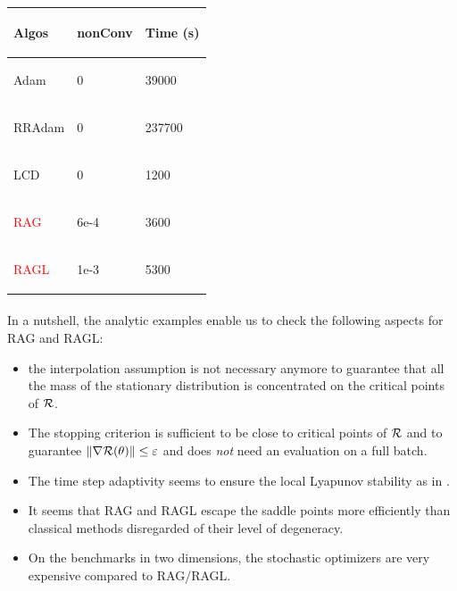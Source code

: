 \begin{table}[h!]
	\begin{tabular}{lll}
		\toprule
		\begin{bf} Algos \end{bf} & \begin{bf}nonConv\end{bf} & \begin{bf}Time (s)\end{bf} \\ \midrule
		\begin{bf}Adam\end{bf} & 0 & 39000 \\ \midrule
		\begin{bf}RRAdam\end{bf} & 0 & 237700 \\ \midrule
		\begin{bf}LCD\end{bf} & 0 & 1200 \\ \midrule
		\begin{bf}\textcolor{red}{RAG}\end{bf} & 6e-4 & 3600 \\ \midrule
		\begin{bf}\textcolor{red}{RAGL}\end{bf} & 1e-3 & 5300 \\ \bottomrule
	\end{tabular}
	\label{poly_exec_sto}
\end{table}

\paragraph{}
In a nutshell, the analytic examples enable us to check the following aspects for RAG and RAGL:
\begin{itemize}
	\item the interpolation assumption is not necessary anymore to guarantee that all the mass of the stationary distribution is concentrated on the critical points of $\mathcal{R}$.
        \item The stopping criterion is sufficient to be close to critical points of $\mathcal{R}$ and to guarantee $\|\nabla \mathcal{R}(\theta)\|\leq \varepsilon$ and does {\em not} need an evaluation on a full batch.
	\item The time step adaptivity seems to ensure the local Lyapunov stability as in \cite{Bilel,Bilel_thesis}.
	\item It seems that RAG and RAGL escape the saddle points more efficiently than classical methods disregarded of their level of degeneracy.
	\item On the benchmarks in two dimensions, the stochastic optimizers are very expensive compared to RAG/RAGL. 
\end{itemize}


